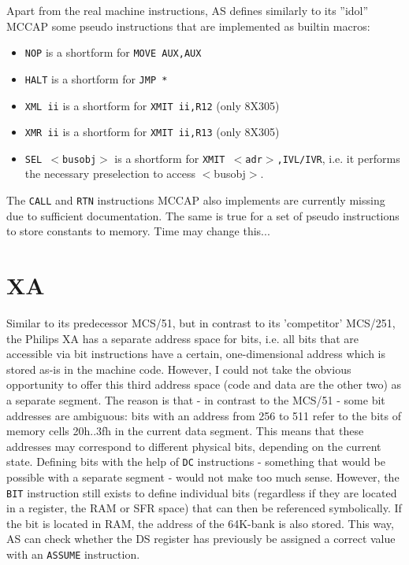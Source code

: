 \documentclass[12pt,twoside]{report}
\newcommand{\tty}[1]{{\tt #1}}
\newcommand{\asname}{{AS}}
\begin{document}
Apart from the real machine instructions, \asname{} defines similarly to its
''idol'' MCCAP some pseudo instructions that are implemented as builtin
macros:
\begin{itemize}
\item{\tty{NOP} is a shortform for \tty{MOVE AUX,AUX}}
\item{\tty{HALT} is a shortform for {\tt JMP \verb!*!}}
\item{\tty{XML ii} is a shortform for \tty{XMIT ii,R12} (only 8X305)}
\item{\tty{XMR ii} is a shortform for \tty{XMIT ii,R13} (only 8X305)}
\item{\tty{SEL $<$busobj$>$} is a shortform for \tty{XMIT $<$adr$>$,IVL/IVR},
   i.e. it performs the necessary preselection to access $<$busobj$>$.}
\end{itemize}
The \tty{CALL} and \tty{RTN} instructions MCCAP also implements are
currently missing due to sufficient documentation.  The same is true for a
set of pseudo instructions to store constants to memory.  Time may change
this...


\section{XA}

Similar to its predecessor MCS/51, but in contrast to its
'competitor' MCS/251, the Philips XA has a separate address space for
bits, i.e. all bits that are accessible via bit instructions have a
certain, one-dimensional address which is stored as-is in the machine
code.  However, I could not take the obvious opportunity to offer
this third address space (code and data are the other two) as a
separate segment.  The reason is that - in contrast to the MCS/51 -
some bit addresses are ambiguous: bits with an address from 256 to 511
refer to the bits of memory cells 20h..3fh in the current data
segment.  This means that these addresses may correspond to different
physical bits, depending on the current state.  Defining bits with
the help of \tty{DC} instructions - something that would be possible with a
separate segment - would not make too much sense.  However, the \tty{BIT}
instruction still exists to define individual bits (regardless if
they are located in a register, the RAM or SFR space) that can then
be referenced symbolically.  If the bit is located in RAM, the
address of the 64K-bank is also stored.  This way, \asname{} can check
whether the DS register has previously be assigned a correct value
with an \tty{ASSUME} instruction.
\end{document}
